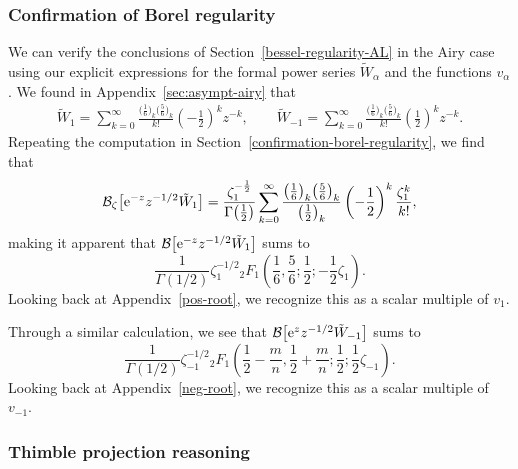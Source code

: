 \documentclass[10pt,a4paper]{amsart}
\newcommand{\borel}{\mathcal{B}}
\numberwithin{equation}{section}
\begin{document}
\subsubsection{Confirmation of Borel regularity}\label{confirmation-borel-regularity-airy}
%
We can verify the conclusions of Section~\ref{bessel-regularity-AL} in the Airy case using our explicit expressions for the formal power series $\tilde{W}_\alpha$ and the functions $v_\alpha$. We found in Appendix~\ref{sec:asympt-airy} that
\begin{align*}
\tilde{W}_1 = \sum_{k = 0}^{\infty} \frac{\bigl(\frac{1}{6}\bigr)_k \bigl(\frac{5}{6}\bigr)_k}{k!} \left(-\frac{1}{2}\right)^k z^{-k} ,\qquad
\tilde{W}_{-1} = \sum_{k = 0}^{\infty} \frac{\bigl(\frac{1}{6}\bigr)_k \bigl(\frac{5}{6}\bigr)_k}{k!} \left(\frac{1}{2}\right)^k z^{-k}.
\end{align*}
Repeating the computation in Section~\ref{confirmation-borel-regularity}, we find that
\[ \borel_\zeta \bigl[ {\rm e}^{-z} z^{-1/2} \tilde{W}_1 \bigr] = \frac{\zeta_1^{-\frac{1}{2}}}{\Gamma\bigl(\frac{1}{2}\bigr)} \sum_{k = 0}^{\infty} \frac{\bigl(\frac{1}{6}\bigr)_k \bigl(\frac{5}{6}\bigr)_k}{\bigl(\frac{1}{2}\bigr)_k} \left(-\frac{1}{2}\right)^k \frac{\zeta_1^k}{k!}, \]
making it apparent that $\borel\bigl[ {\rm e}^{-z} z^{-1/2} \tilde{W}_1 \bigr]$ sums to
\[ \frac{1}{\Gamma(1/2)} \zeta_1^{-1/2} {}_2F_1\left(\frac{1}{6}, \frac{5}{6}; \frac{1}{2}; -\frac{1}{2}\zeta_1\right). \]
Looking back at Appendix~\ref{pos-root}, we recognize this as a scalar multiple of $v_1$.

Through a similar calculation, we see that $\borel\bigl[ {\rm e}^z z^{-1/2} \tilde{W}_{-1} \bigr]$ sums to
\[ \frac{1}{\Gamma(1/2)} \zeta_{-1}^{-1/2} {}_2F_1\left(\frac{1}{2}-\frac{m}{n}, \frac{1}{2}+\frac{m}{n}; \frac{1}{2}; \frac{1}{2}\zeta_{-1}\right). \]
Looking back at Appendix~\ref{neg-root}, we recognize this as a scalar multiple of $v_{-1}$.

\subsubsection{Thimble projection reasoning}\label{contour-argument-airy}
\end{document}
